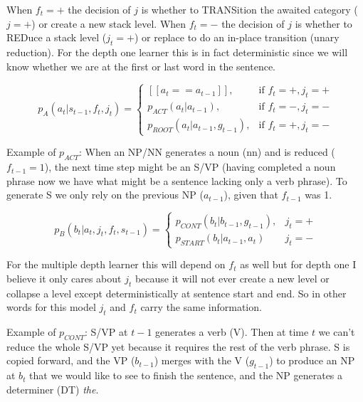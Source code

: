 \documentclass[12pt]{article}
\begin{document}
When $f_{t}=+$ the decision of $j$ is whether to TRANSition the awaited category ($j=+$) or create a new stack level. When $f_{t}=-$ the decision of $j$ is whether to REDuce a stack level ($j_t=+$) or replace to do an in-place transition (unary reduction). For the depth one learner this is in fact deterministic since we will know whether we are at the first or last word in the sentence.

\begin{samepage}
\begin{equation}
p_{A}(a_t | s_{t-1},f_t,j_t) = 
  \begin{cases}
   [[a_t==a_{t-1}]], & \text{if } f_{t}=+, j_{t}=+  \\
    p_{ACT}(a_t|a_{t-1}), & \text{if } f_t=-, j_t=- \\
    p_{ROOT}(a_t|a_{t-1},g_{t-1}), &\text{if } f_t=+,j_t=-
  \end{cases}
\end{equation}

Example of $p_{ACT}$: When an NP/NN generates a noun (nn) and is reduced ($f_{t-1}=1$), the next time step might be an S/VP (having completed a noun phrase now we have what might be a sentence lacking only a verb phrase). To generate S we only rely on the previous NP ($a_{t-1}$), given that $f_{t-1}$ was 1.
\end{samepage}

\begin{equation}
p_{B}(b_t | a_t,j_t,f_t,s_{t-1}) = 
  \begin{cases}
   p_{CONT}(b_t|b_{t-1},g_{t-1}), & j_{t}=+ \\
   p_{START}(b_t|a_{t-1},a_t) & j_{t}=-
   \end{cases}
\end{equation}

For the multiple depth learner this will depend on $f_t$ as well but for depth one I believe it only cares about $j_t$ because it will not ever create a new level or collapse a level except deterministically at sentence start and end. So in other words for this model $j_t$ and $f_t$ carry the same information.

Example of $p_{CONT}$: S/VP at $t-1$ generates a verb (V). Then at time $t$ we can't reduce the whole S/VP yet because it requires the rest of the verb phrase. S is copied forward, and the VP ($b_{t-1}$) merges with the V ($g_{t-1}$) to produce an NP at $b_t$ that we would like to see to finish the sentence, and the NP generates a determiner (DT) \emph{the}.
\end{document}
